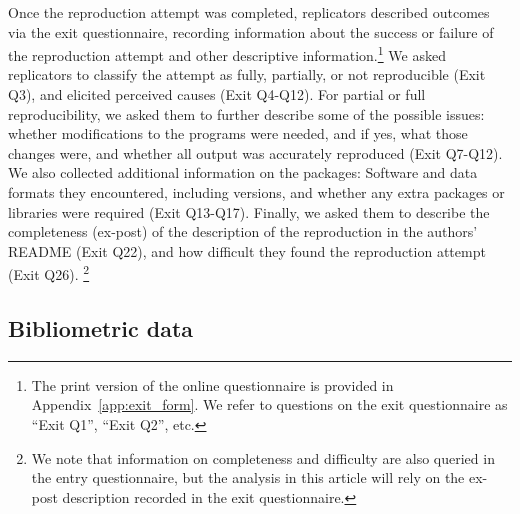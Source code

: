 Once the reproduction attempt was completed, replicators described outcomes via the exit questionnaire, recording information about the success or failure of the reproduction attempt and other descriptive information.\footnote{The print version of the online questionnaire is provided in Appendix~\ref{app:exit_form}. We refer to questions on the exit questionnaire as ``Exit Q1'', ``Exit Q2'', etc.} We asked replicators to classify the attempt as fully, partially, or not reproducible (Exit Q3), and elicited perceived causes (Exit Q4-Q12). 
For partial or full reproducibility, we asked them to further describe some of the possible issues: whether modifications to the programs were needed, and if yes, what those changes were, and whether all output was accurately reproduced (Exit Q7-Q12). We also collected additional information on the packages: Software and data formats they encountered, including versions, and whether any extra packages or libraries were required (Exit Q13-Q17). Finally, we asked them to describe the completeness (ex-post) of the description of the reproduction in the authors' README (Exit Q22), and how difficult they found the reproduction attempt (Exit Q26).%
%
\footnote{
We note that information on completeness and difficulty are also queried in the entry questionnaire, but the analysis in this article will rely on the ex-post description recorded in the exit questionnaire. }



\subsection{Bibliometric data}

